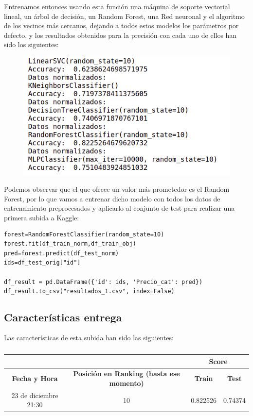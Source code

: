 \documentclass[a4paper,11pt]{article}
\begin{document}
Entrenamos entonces usando esta función una máquina de soporte vectorial lineal, un árbol de decisión, un Random Forest, una Red neuronal y el algoritmo de los vecinos más cercanos, dejando a todos estos modelos los parámetros por defecto, y los resultados obtenidos para la precisión con cada uno de ellos han sido los siguientes:
\begin{figure}[H]
	\centering
	\includegraphics[width=0.5\linewidth]{img/alg1}
	\caption{}
	\label{fig:alg1}
\end{figure}

Podemos observar que el que ofrece un valor más prometedor es el Random Forest, por lo que vamos a entrenar dicho modelo con todos los datos de entrenamiento preprocesados y aplicarlo al conjunto de test para realizar una primera subida a Kaggle:
\begin{verbatim}
forest=RandomForestClassifier(random_state=10)
forest.fit(df_train_norm,df_train_obj)
pred=forest.predict(df_test_norm)
ids=df_test_orig["id"]

df_result = pd.DataFrame({'id': ids, 'Precio_cat': pred})
df_result.to_csv("resultados_1.csv", index=False)
\end{verbatim}

\subsection{Características entrega}
Las características de esta subida han sido las siguientes: 

\begin{table}[htbp]
	\caption{}
	\begin{tabular}{|c|c|c|c|}
		\hline
		\textbf{} & \textbf{} & \multicolumn{ 2}{c|}{\textbf{Score}} \\ \hline
		\textbf{Fecha y Hora} & \textbf{Posición en Ranking (hasta ese momento)} & \textbf{Train} & \textbf{Test} \\ \hline
		23 de diciembre 21:30 & 10 & 0.822526 & 0.74374 \\ \hline
	\end{tabular}
	\label{}
\end{table}
\end{document}
